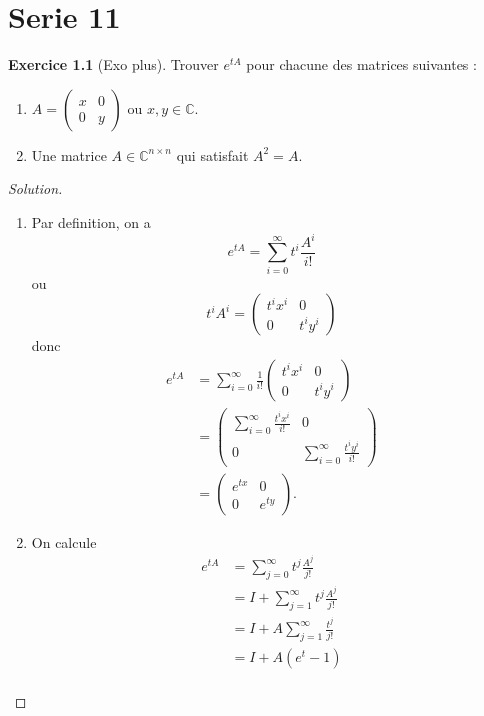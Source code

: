 \documentclass[a4paper,12pt,french]{report}
\theoremstyle{plain}
\theoremstyle{definition}
\newtheorem{exercise}{Exercice}[chapter]
\begin{document}
\chapter{Serie 11}
\begin{exercise}[Exo plus]
Trouver $e^{ tA }$ pour chacune des matrices suivantes :
\begin{enumerate}
\item $A=\begin{pmatrix}x & 0 \\ 0 & y\end{pmatrix}$ ou $x,y\in \mathbb{C}$.
\item Une matrice $A\in \mathbb{C}^{n\times n}$ qui satisfait $A^{2}=A$.
\end{enumerate}
\end{exercise}
\begin{proof}[Solution]
\begin{enumerate}
\item Par definition, on a
$$
e^{ tA}=\sum _{i=0}^{\infty} t^{i} \frac{A^{i}}{i!}
$$
ou
$$
t^{i}A^{i}=\begin{pmatrix}
t^{i}x^{i} & 0 \\
0 & t^{i}y^{i}
\end{pmatrix}
$$
donc
\begin{align*}
e^{ tA } & =\sum_{i=0}^{\infty}  \frac{1}{i!}\begin{pmatrix}
t^{i}x^{i} & 0 \\
0 & t^{i}y^{i}
\end{pmatrix} \\
 & =\begin{pmatrix}
\sum _{i=0}^{\infty} \frac{t^{i}x^{i}}{i!} & 0 \\
0 & \sum_{i=0}^{\infty}  \frac{t^{i}y^{i}}{i!}
\end{pmatrix} \\
 & =\begin{pmatrix}
e^{ tx } & 0 \\
0 & e^{ ty }
\end{pmatrix}.
\end{align*}
\item On calcule
\begin{align*}
e^{ tA } & =\sum_{j=0}^{\infty}  t^{j} \frac{A^{j}}{j!} \\
 & =I + \sum_{j=1}^{\infty} t^{j} \frac{A^{j}}{j!} \\
 & =I +A\sum _{j=1}^{\infty} \frac{t^{j}}{j!} \\
 & =I + A(e^{t}-1) \\
\end{align*}
\end{enumerate}
\end{proof}
\end{document}

